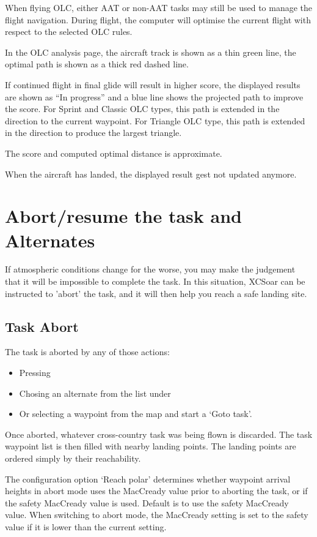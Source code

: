 When flying OLC, either AAT or non-AAT tasks may still be used to
manage the flight navigation.  During flight, the computer will optimise the
current flight with respect to the selected OLC rules.  

In the OLC analysis page, the aircraft track is shown as a thin green line, the optimal 
path is shown as a thick red dashed line.

If continued flight in final glide will result in higher score, the displayed
results are shown as ``In progress'' and a blue line shows the projected path 
to improve the score. For Sprint and Classic OLC types, this path is extended in the direction 
to the current waypoint. For Triangle OLC type, this path is extended in the direction to 
produce the largest triangle. 

The score and computed optimal distance is approximate.


When the aircraft has landed, the displayed result gest not updated anymore.


\section{Abort/resume the task and Alternates}

If atmospheric conditions change for the worse, you may make the
judgement that it will be impossible to complete the task.  In this
situation, XCSoar can be instructed to 'abort' the task, and it will
then help you reach a safe landing site.

\subsection*{Task Abort}
The task is aborted by any of those actions:
\begin{itemize}
\item Pressing \blink{}
\item Chosing an alternate from the list under  
 \blink{}
\item Or selecting a waypoint from the map and start a `Goto task'.
\end{itemize}

Once aborted, whatever cross-country task was being flown is
discarded.  The task waypoint list is then filled with nearby landing
points. The landing points are ordered simply by their reachability.

The configuration option `Reach polar' determines whether
waypoint arrival heights in abort mode uses the MacCready value prior
to aborting the task, or if the safety MacCready value is used. 
Default is to use the safety MacCready value.  When switching to
abort mode, the MacCready setting is set to the safety value 
if it is lower than the current setting.


